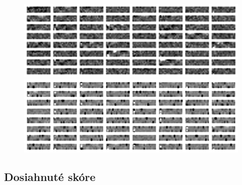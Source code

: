 \documentclass[10pt,a4paper]{article}
\begin{document}
\begin{figure}[!htb]
\centering
\begin{minipage}{.5\textwidth}
  \centering
  \includegraphics[scale=0.4]{../../diagrams/layer_1_fnn_sparse.png}
\end{minipage}%
\begin{minipage}{.5\textwidth}
  \centering
  \includegraphics[scale=0.4]{../../diagrams/layer_1_hnn_sparse.png}
\end{minipage}
\end{figure}



\subsection{Dosiahnuté skóre}
\end{document}
